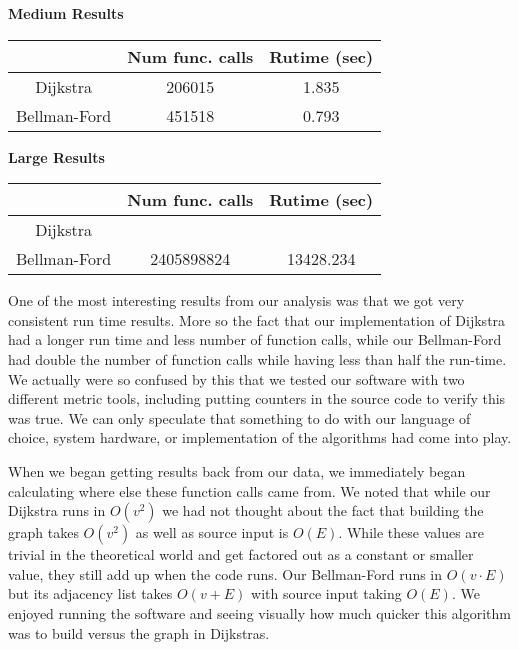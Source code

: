 \documentclass{article}
\begin{document}
\begin{multicols}{2}
\hspace{20 pt} \textbf{Medium Results}\\
\centering
\begin{tabular}{||c|c|c||}
\hline
& Num func. calls & Rutime (sec) \\
\hline
Dijkstra & 206015 & 1.835\\
\hline
Bellman-Ford & 451518 & 0.793\\
\hline
\end{tabular}


\hspace{05 pt} \textbf{Large Results}\\
\centering
\begin{tabular}{||c|c|c||}
\hline
& Num func. calls & Rutime (sec) \\
\hline
Dijkstra &  & \\
\hline
Bellman-Ford & 2405898824 & 13428.234 \\
\hline
\end{tabular}
\end{multicols}



\vspace{15 pt}
One of the most interesting results from our analysis was that we got very consistent run time results. More so the fact that our implementation of Dijkstra had a longer run time and less number of function calls, while our Bellman-Ford had double the number of function calls while having less than half the run-time. We actually were so confused by this that we tested our software with two different metric tools, including putting counters in the source code to verify this was true. We can only speculate that something to do with our language of choice, system hardware, or implementation of the algorithms had come into play.

When we began getting results back from our data, we immediately began calculating where else these function calls came from. We noted that while our Dijkstra runs in $O(v^2)$ we had not thought about the fact that building the graph takes $O(v^2)$ as well as source input is $O(E)$. While these values are trivial in the theoretical world and get factored out as a constant or smaller value, they still add up when the code runs. 
Our Bellman-Ford runs in $O(v \cdot E)$ but its adjacency list takes $O(v+E)$ with source input taking $O(E)$. We enjoyed running the software and seeing visually how much quicker this algorithm was to build versus the graph in Dijkstras.
\end{document}
